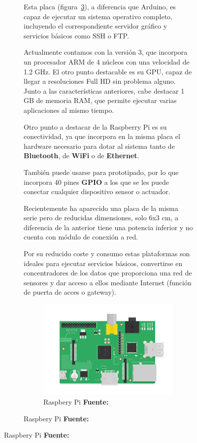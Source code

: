 \begin{itemize}
\begin{itemize}
\begin{figure}[h]
\begin{figure}[h]
Esta placa (figura~\ref{fig:raspberry_pi}), a diferencia que Arduino, es capaz de ejecutar un sistema operativo completo, incluyendo el correspondiente servidor gráfico y servicios básicos como SSH o FTP. 

Actualmente contamos con la versión 3, que incorpora un procesador ARM de 4 núcleos con una velocidad de 1.2 GHz. El otro punto destacable es su GPU, capaz de llegar a resoluciones Full HD sin problema alguno. Junto a las características anteriores, cabe destacar 1 GB de memoria RAM, que permite ejecutar varias aplicaciones al mismo tiempo.

Otro punto a destacar de la Raspberry Pi es su conectividad, ya que incorpora en la misma placa el hardware necesario para dotar al sistema tanto de \textbf{Bluetooth}, de \textbf{WiFi} o de \textbf{Ethernet}.

También puede usarse para prototipado, por lo que incorpora 40 pines \textbf{GPIO} a los que se les puede conectar cualquier dispositivo sensor o actuador.

Recientemente ha aparecido una placa de la misma serie pero de reducidas dimensiones, solo 6x3 cm, a diferencia de la anterior tiene una potencia inferior y no cuenta con módulo de conexión a red.

Por su reducido coste y consumo estas plataformas son ideales para ejecutar servicios básicos, convertirse en concentradores de los datos que proporciona una red de sensores y dar acceso a ellos mediante Internet (función de puerta de acces o gateway).



\begin{figure}[h]
\centering
\includegraphics[width=0.8\linewidth]{../images/raspberry_pi}
\caption[Raspbery Pi]{Raspbery Pi \textbf{Fuente:} \cite{imagen_raspberrypi}}
\label{fig:raspberry_pi}
\end{figure}





\end{figure}
\end{figure}
\end{itemize}
\end{itemize}
